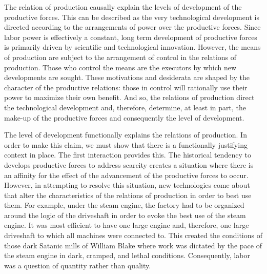 \documentclass[letterpaper,notitlepage,12pt]{article}
\begin{document}
The relation of production causally explain the levels of development of the
productive forces.
This can be described as the very technological development is directed
according to the arrangements of power over the productive forces.
Since labor power is effectively a constant, long term development of productive
forces is primarily driven by scientific and technological innovation.
However, the means of production are subject to the arrangement of control in
the relations of production.
Those who control the means are the executors by which new developments are
sought.
These motivations and desiderata are shaped by the character of the productive
relations: those in control will rationally use their power to maximize their
own benefit.
And so, the relations of production direct the technological development and,
therefore, determine, at least in part, the make-up of the productive forces and
consequently the level of development.

The level of development functionally explains the relations of production.
In order to make this claim, we must show that there is a functionally
justifying context in place.
The first interaction provides this.
The historical tendency to develops productive forces to address scarcity
creates a situation where there is an affinity for the effect of the advancement
of the productive forces to occur.
However, in attempting to resolve this situation, new technologies come about
that alter the characteristics of the relations of production in order to best
use them.
For example, under the steam engine, the factory had to be organized around the
logic of the driveshaft in order to evoke the best use of the steam engine.
It was most efficient to have one large engine and, therefore, one large
driveshaft to which all machines were connected to.
This created the conditions of those dark Satanic mills of William Blake where
work was dictated by the pace of the steam engine in dark, cramped, and lethal
conditions.
Consequently, labor was a question of quantity rather than quality.
\end{document}
